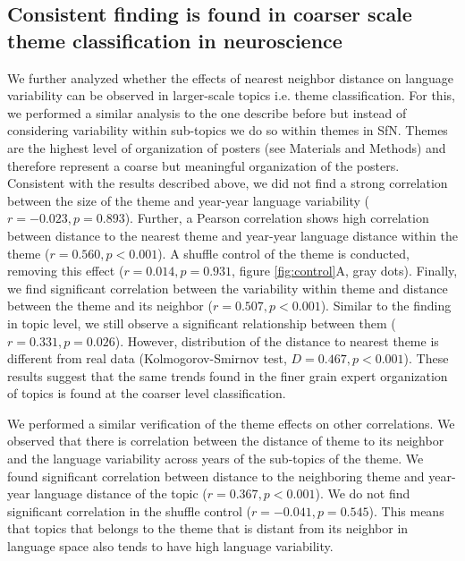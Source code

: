 \documentclass[10pt,letterpaper]{article}
\begin{document}
\subsection*{Consistent finding is found in coarser scale theme classification in neuroscience}
We further analyzed whether the effects of nearest neighbor distance on language variability can be observed in larger-scale topics i.e. theme classification. For this, we performed a similar analysis to the one describe before but instead of considering variability within sub-topics we do so within themes in SfN. Themes are the highest level of organization of posters (see Materials and Methods) and therefore represent a coarse but meaningful organization of the posters. Consistent with the results described above, we did not find a strong correlation between the size of the theme and year-year language variability ($r = -0.023, p = 0.893$). Further, a Pearson correlation shows high correlation between distance to the nearest theme and year-year language distance within the theme ($r=0.560, p < 0.001$). A shuffle control of the theme is conducted, removing this effect ($r = 0.014, p = 0.931$, figure \ref{fig:control}A, gray dots). Finally, we find significant correlation between the variability within theme and distance between the theme and its neighbor ($r = 0.507, p < 0.001$). Similar to the finding in topic level, we still observe a significant relationship between them ($r = 0.331, p = 0.026$). However, distribution of the distance to nearest theme is different from real data (Kolmogorov-Smirnov test, $D = 0.467, p < 0.001$). These results suggest that the same trends found in the finer grain expert organization of topics is found at the coarser level classification.

We performed a similar verification of the theme effects on other correlations. We observed that there is correlation between the distance of theme to its neighbor and the language variability across years of the sub-topics of the theme. We found significant correlation between distance to the neighboring theme and year-year language distance of the topic ($r = 0.367, p < 0.001$). We do not find significant correlation in the shuffle control ($r = -0.041, p = 0.545$). This means that topics that belongs to the theme that is distant from its neighbor in language space also tends to have high language variability.
\end{document}
